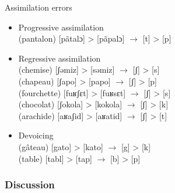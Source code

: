 \documentclass[output=paper,newtxmath,modfonts,nonflat,draftmode]{langsci/langscibook}
\begin{document}
\begin{exe}
\ex Assimilation errors \label{ex:takam:assimilation_errors}
\begin{itemize}
    \item Progressive assimilation\\
    (pantalon)  [pãtalɔ] > [pãpalɔ] $\rightarrow$ [t] > [p]\\
    \item Regressive assimilation\\
    (chemise) [ʃəmiz] > [səmiz] $\rightarrow$ [ʃ] > [s]\\
    (chapeau) [ʃapo] > [papo] $\rightarrow$ [ʃ] > [p]\\
    (fourchette) [fuʁʃɛt] > [fuʁsɛt] $\rightarrow$ [ʃ] > [s]\\
    (chocolat) [ʃokola] > [kokola] $\rightarrow$ [ʃ] > [k]\\ 
(arachide) [aʁaʃid] > [aʁatid] $\rightarrow$  [ʃ] > [t]\\
    \item Devoicing\\
    (gâteau) [gato] > [kato] $\rightarrow$ [g] > [k]\\
    (table) [tabl] > [tap] $\rightarrow$ [b] > [p]\\
\end{itemize}
\end{exe}




\subsubsection{Discussion} %
\end{document}
